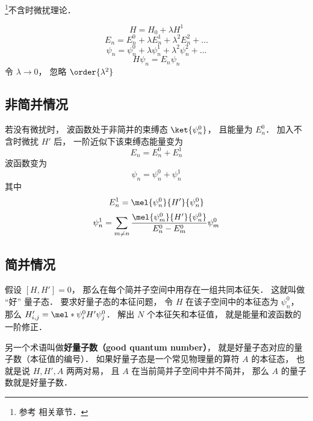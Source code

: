 
\begin{issues}
\issueDraft
\end{issues}

\footnote{参考 \cite{GriffQ} 相关章节．}不含时微扰理论．

\begin{equation}
H = H_0 + \lambda H^1
\end{equation}
\begin{equation}
E_n = E_n^0 + \lambda E_n^1 + \lambda^2 E_n^2 + \dots
\end{equation}
\begin{equation}
\psi_n = \psi_n^0 + \lambda\psi_n^1 + \lambda^2 \psi_n^2 + \dots
\end{equation}
\begin{equation}
H \psi_n = E_n \psi_n
\end{equation}
令 $\lambda \to 0$， 忽略 $\order{\lambda^2}$

\subsection{非简并情况}
若没有微扰时， 波函数处于非简并的束缚态 $\ket{\psi_n^0}$， 且能量为 $E_n^0$． 加入不含时微扰 $H'$ 后， 一阶近似下该束缚态能量变为
\begin{equation}
E_n = E_n^0 + E_n^1
\end{equation}
波函数变为
\begin{equation}
\psi_n = \psi_n^0 + \psi_n^1
\end{equation}
其中
\begin{equation}
E_n^1 = \mel{\psi_n^0}{H'}{\psi_n^0}
\end{equation}
\begin{equation}
\psi_n^1 = \sum_{m \ne n} \frac{\mel{\psi_m^0}{H'}{\psi_n^0}}{E_n^0 - E_m^0} \psi_m^0
\end{equation}

\subsection{简并情况}
假设 $[H, H'] = 0$， 那么在每个简并子空间中用存在一组共同本征矢． 这就叫做 “好” 量子态． 要求好量子态的本征问题， 令 $H$ 在该子空间中的本征态为 $\psi_n^0$， 那么 $H'_{i,j} = \mel*{\psi_i^0}{H'}{\psi_j^0}$． 解出 $N$ 个本征矢和本征值， 就是能量和波函数的一阶修正．

另一个术语叫做\textbf{好量子数（good quantum number）}， 就是好量子态对应的量子数（本征值的编号）． 如果好量子态是一个常见物理量的算符 $A$ 的本征态， 也就是说 $H, H', A$ 两两对易， 且 $A$ 在当前简并子空间中并不简并， 那么 $A$ 的量子数就是好量子数．
